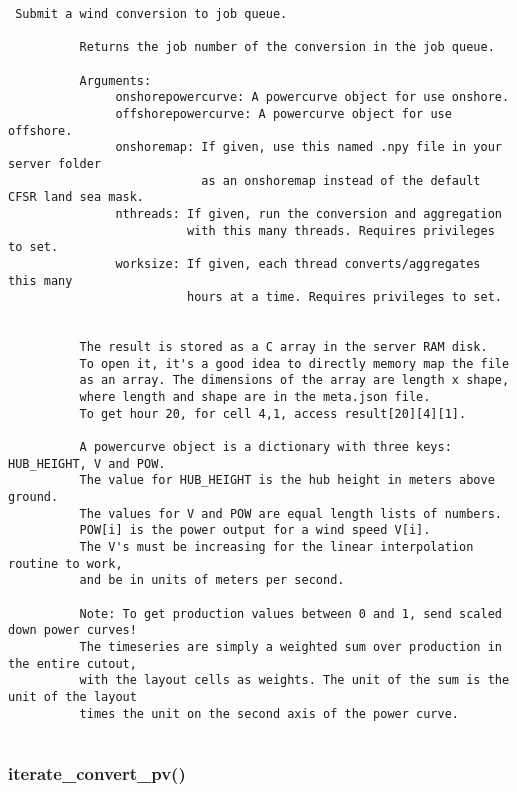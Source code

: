 \begin{verbatim}
 Submit a wind conversion to job queue.

          Returns the job number of the conversion in the job queue.

          Arguments:
               onshorepowercurve: A powercurve object for use onshore.
               offshorepowercurve: A powercurve object for use offshore.
               onshoremap: If given, use this named .npy file in your server folder
                           as an onshoremap instead of the default CFSR land sea mask.
               nthreads: If given, run the conversion and aggregation
                         with this many threads. Requires privileges to set.
               worksize: If given, each thread converts/aggregates this many
                         hours at a time. Requires privileges to set.

     
          The result is stored as a C array in the server RAM disk.
          To open it, it's a good idea to directly memory map the file
          as an array. The dimensions of the array are length x shape,
          where length and shape are in the meta.json file.
          To get hour 20, for cell 4,1, access result[20][4][1].

          A powercurve object is a dictionary with three keys: HUB_HEIGHT, V and POW.
          The value for HUB_HEIGHT is the hub height in meters above ground.
          The values for V and POW are equal length lists of numbers.
          POW[i] is the power output for a wind speed V[i].
          The V's must be increasing for the linear interpolation routine to work,
          and be in units of meters per second.

          Note: To get production values between 0 and 1, send scaled down power curves!
          The timeseries are simply a weighted sum over production in the entire cutout,
          with the layout cells as weights. The unit of the sum is the unit of the layout
          times the unit on the second axis of the power curve.
          
\end{verbatim}
\subsubsection{iterate\_convert\_pv()}


